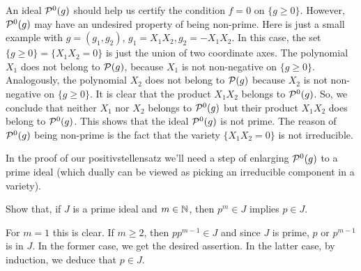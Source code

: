 An ideal $\mathcal{P}^0(g)$ should help us certify the condition $f=0$ on $\{g \ge 0\}$. However, $\mathcal{P}^0(g)$ may have an undesired property of being non-prime. Here is just a small example with $g=(g_1,g_2)$, $g_1=X_1 X_2, g_2 = -X_1 X_2$. In this case, the set $\{g \ge 0\} = \{X_1 X_2 = 0\}$ is just the union of two coordinate axes. The polynomial $X_1$ does not belong to $\mathcal{P}(g)$, because $X_1$ is not non-negative on $\{g \ge 0\}$. Analogously, the polynomial $X_2$ does not belong to $\mathcal{P}(g)$ because $X_2$ is not non-negative on $\{g \ge 0\}$. It is clear that the product $X_1 X_2$ belongs to $\mathcal{P}^0(g)$. So, we conclude that neither $X_1$ nor $X_2$ belongs to $\mathcal{P}^0(g)$ but their product $X_1 X_2$ does belong to $\mathcal{P}^0(g)$. This shows that the ideal $\mathcal{P}^0(g)$ is not prime. The reason of $\mathcal{P}^0(g)$ being non-prime is the fact that the variety $\{X_1 X_2 = 0\}$ is not irreducible. 

In the proof of our positivstellensatz  we'll need a step of enlarging $\mathcal{P}^0(g)$ to a prime ideal (which dually can be viewed as picking an irreducible component in a variety). 


\begin{exercise}
	\label{powers:prime:ideals}
	Show that, if $J$ is a prime ideal and $m \in \mathbb{N}$, then $p^m \in J$ implies $p \in J$.
\end{exercise}
\begin{solution}
	For $m=1$ this is clear. If $m \ge 2$, then $p p^{m-1} \in J$ and since $J$ is prime, $p$ or $p^{m-1}$ is in $J$. In the former case, we get the desired assertion. In the latter case, by induction, we deduce that $p \in J$.
\end{solution}

